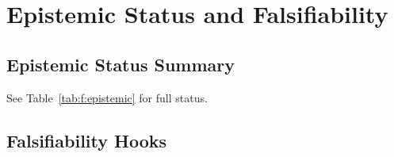 \section{Epistemic Status and Falsifiability}
\label{sec:frustrated:falsifiability}

\subsection{Epistemic Status Summary}

See Table~\ref{tab:f:epistemic} for full status.

\subsection{Falsifiability Hooks}


